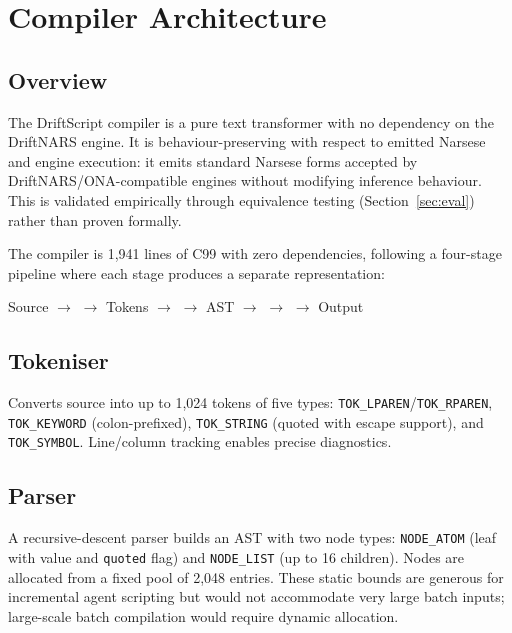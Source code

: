 \documentclass[11pt,a4paper]{article}
\begin{document}
\section{Compiler Architecture}
\label{sec:compiler}

\subsection{Overview}

The DriftScript compiler is a pure text transformer with no dependency on the
DriftNARS engine. It is behaviour-preserving with respect to emitted Narsese and engine
execution: it emits standard Narsese forms accepted by DriftNARS/ONA-compatible
engines without modifying inference behaviour. This is validated empirically
through equivalence testing (Section~\ref{sec:eval}) rather than proven
formally.

The compiler is 1{,}941 lines of C99 with zero dependencies, following a
four-stage pipeline where each stage produces a separate representation:

\begin{center}
Source $\rightarrow$  $\rightarrow$ Tokens $\rightarrow$
 $\rightarrow$ AST $\rightarrow$  $\rightarrow$
 $\rightarrow$ Output
\end{center}

\subsection{Tokeniser}

Converts source into up to 1{,}024 tokens of five types:
\texttt{TOK\_LPAREN}/\texttt{TOK\_RPAREN}, \texttt{TOK\_KEYWORD}
(colon-prefixed), \texttt{TOK\_STRING} (quoted with escape support), and
\texttt{TOK\_SYMBOL}. Line/column tracking enables precise diagnostics.

\subsection{Parser}

A recursive-descent parser builds an AST with two node types:
\texttt{NODE\_ATOM} (leaf with value and \texttt{quoted} flag) and
\texttt{NODE\_LIST} (up to 16 children). Nodes are allocated from a fixed
pool of 2{,}048 entries. These static bounds are generous for incremental
agent scripting but would not accommodate very large batch inputs; large-scale
batch compilation would require dynamic allocation.
\end{document}

